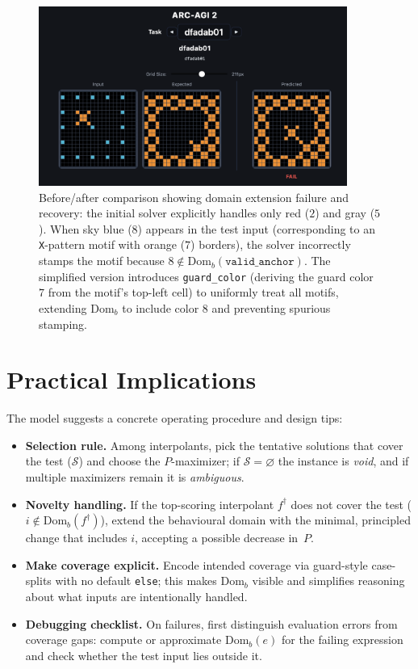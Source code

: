 \documentclass[11pt]{article}
\newcommand{\Domb}{\mathrm{Dom}_b}
\begin{document}
\begin{figure}[ht]
\centering
\includegraphics[width=0.9\textwidth]{images/solver_comparison.png}
\caption{Before/after comparison showing domain extension failure and recovery: the initial solver explicitly handles only red ($2$) and gray ($5$). When sky blue ($8$) appears in the test input (corresponding to an \texttt{X}-pattern motif with orange ($7$) borders), the solver incorrectly stamps the motif because $8 \notin \Domb(\texttt{valid\_anchor})$. The simplified version introduces \texttt{guard\_color} (deriving the guard color $7$ from the motif's top-left cell) to uniformly treat all motifs, extending $\Domb$ to include color $8$ and preventing spurious stamping.}
\label{fig:comparison}
\end{figure}

\section{Practical Implications}

The model suggests a concrete operating procedure and design tips:
\begin{itemize}[leftmargin=1.5em]
\item \textbf{Selection rule.} Among interpolants, pick the tentative solutions that cover the test ($\mathcal{S}$) and choose the $P$-maximizer; if $\mathcal{S}=\varnothing$ the instance is \emph{void}, and if multiple maximizers remain it is \emph{ambiguous}.
\item \textbf{Novelty handling.} If the top-scoring interpolant $f^\dagger$ does not cover the test ($i\notin \Domb(f^\dagger)$), extend the behavioural domain with the minimal, principled change that includes $i$, accepting a possible decrease in~$P$.
\item \textbf{Make coverage explicit.} Encode intended coverage via guard-style case-splits with no default \texttt{else}; this makes $\Domb$ visible and simplifies reasoning about what inputs are intentionally handled.
\item \textbf{Debugging checklist.} On failures, first distinguish evaluation errors from coverage gaps: compute or approximate $\Domb(e)$ for the failing expression and check whether the test input lies outside it.
\end{itemize}
\end{document}
